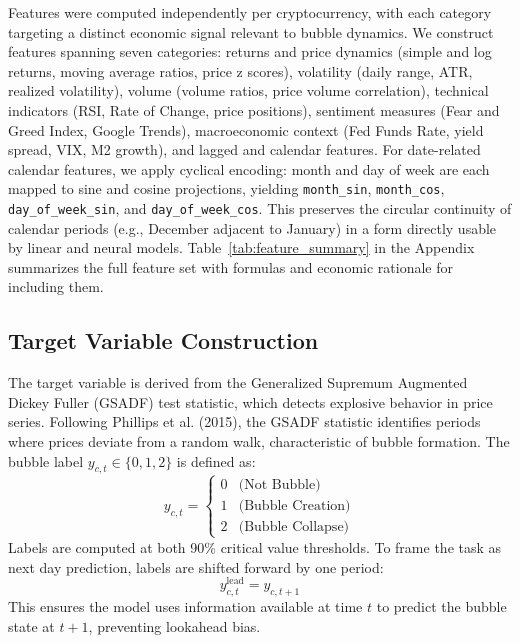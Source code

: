 \documentclass[12pt,a4paper]{article}
\begin{document}
Features were computed independently per cryptocurrency, with each category targeting a distinct economic signal relevant to bubble dynamics. We construct features spanning seven categories: returns and price dynamics (simple and log returns, moving average ratios, price z scores), volatility (daily range, ATR, realized volatility), volume (volume ratios, price volume correlation), technical indicators (RSI, Rate of Change, price positions), sentiment measures (Fear and Greed Index, Google Trends), macroeconomic context (Fed Funds Rate, yield spread, VIX, M2 growth), and lagged and calendar features. For date-related calendar features, we apply cyclical encoding: month and day of week are each mapped to sine and cosine projections, yielding \texttt{month\_sin}, \texttt{month\_cos}, \texttt{day\_of\_week\_sin}, and \texttt{day\_of\_week\_cos}. This preserves the circular continuity of calendar periods (e.g., December adjacent to January) in a form directly usable by linear and neural models. Table~\ref{tab:feature_summary} in the Appendix summarizes the full feature set with formulas and economic rationale for including them.


\subsection{Target Variable Construction}
 
The target variable is derived from the Generalized Supremum Augmented Dickey Fuller (GSADF) test statistic, which detects explosive behavior in price series. Following Phillips et al. (2015), the GSADF statistic identifies periods where prices deviate from a random walk, characteristic of bubble formation. 
The bubble label $y_{c,t} \in \{0, 1, 2\}$ is defined as:
\begin{equation}
y_{c,t} = \begin{cases}
0 & \text{(Not Bubble)} \\
1 & \text{(Bubble Creation)} \\
2 & \text{(Bubble Collapse)}
\end{cases}
\end{equation}
Labels are computed at both 90\% critical value thresholds. To frame the task as next day prediction, labels are shifted forward by one period:
\begin{equation}
y_{c,t}^{\text{lead}} = y_{c,t+1}
\end{equation}
This ensures the model uses information available at time $t$ to predict the bubble state at $t+1$, preventing lookahead bias. 
 
\end{document}
